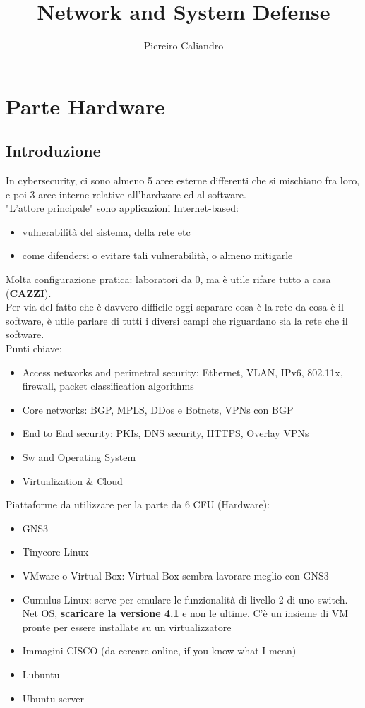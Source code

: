 \documentclass[12pt, oneside]{extbook} %
\title{Network and System Defense}
\author{Pierciro Caliandro}
\begin{document}
\maketitle
\tableofcontents
\newpage
\part{Parte Hardware}
\chapter{Introduzione}
In cybersecurity, ci sono almeno 5 aree esterne differenti che si mischiano fra loro, e poi 3 aree interne relative all'hardware ed al software.\\ "L'attore principale" sono applicazioni Internet-based:
\begin{itemize}
\item vulnerabilità del sistema, della rete etc
\item come difendersi o evitare tali vulnerabilità, o almeno mitigarle
\end{itemize}
Molta configurazione pratica: laboratori da 0, ma è utile rifare tutto a casa (\textbf{CAZZI}).\\ Per via del fatto che è davvero difficile oggi separare cosa è la rete da cosa è il software, è utile parlare di tutti i diversi campi che riguardano sia la rete che il software.\\ Punti chiave:
\begin{itemize}
\item Access networks and perimetral security: Ethernet, VLAN, IPv6, 802.11x, firewall, packet classification algorithms
\item Core networks: BGP, MPLS, DDos e Botnets, VPNs con BGP
\item End to End security: PKIs, DNS security, HTTPS, Overlay VPNs
\item Sw and Operating System
\item Virtualization \& Cloud 
\end{itemize}
Piattaforme da utilizzare per la parte da 6 CFU (Hardware):
\begin{itemize}
\item GNS3
\item Tinycore Linux
\item VMware o Virtual Box: Virtual Box sembra lavorare meglio con GNS3
\item Cumulus Linux: serve per emulare le funzionalità di livello 2 di uno switch. Net OS, \textbf{scaricare la versione 4.1} e non le ultime. C'è un insieme di VM pronte per essere installate su un virtualizzatore
\item Immagini CISCO (da cercare online, if you know what I mean)
\item Lubuntu
\item Ubuntu server
\end{itemize}
\end{document}
